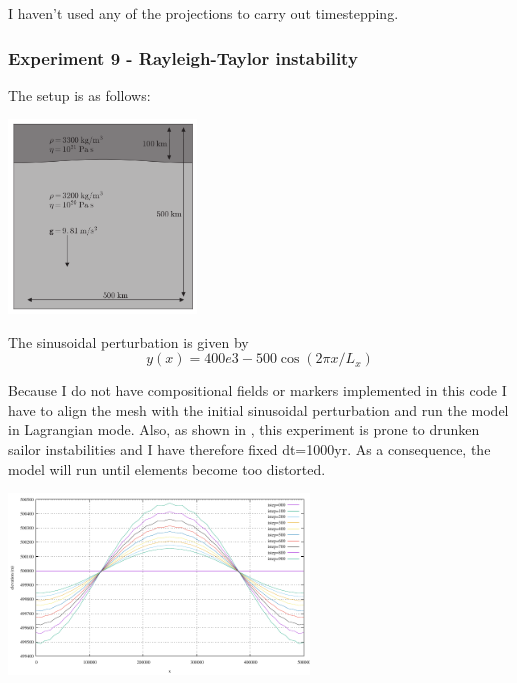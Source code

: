 I haven't used any of the projections to carry out timestepping.



\subsubsection*{Experiment 9 - Rayleigh-Taylor instability}

The setup is as follows:
\begin{center}
\includegraphics[width=5cm]{python_codes/fieldstone_54/images/exp9/robh17}
\end{center}
The sinusoidal perturbation is given by 
\[
y(x)=400e3 - 500 \cos( 2 \pi x /L_x)
\]

Because I do not have compositional fields or markers implemented in this code I have 
to align the mesh with the initial sinusoidal perturbation and run the model in 
Lagrangian mode. Also, as shown in \cite{kamm10}, this experiment is prone to drunken sailor 
instabilities and I have therefore fixed dt=1000yr.
As a consequence, the model will run until elements become too distorted. 

\begin{center}
\includegraphics[width=8cm]{python_codes/fieldstone_54/images/exp9/surface}
\end{center}




